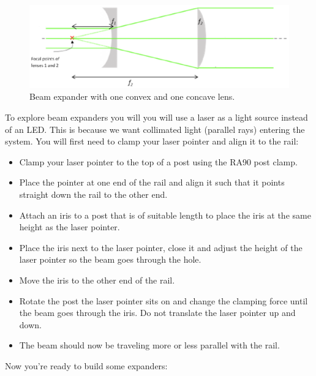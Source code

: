 \documentclass[a4paper]{report}
\begin{document}
\begin{figure}[h]
\center
\includegraphics[width=4.5in]{beamExpander2.eps}
\caption{Beam expander with one convex and one concave lens.}
\label{beamExpander2}
\end{figure}

To explore beam expanders you will you will use a laser as a light source instead of an LED. 
This is because we want collimated light (parallel rays) entering the system. 
You will first need to clamp your laser pointer and align it to the rail:

\begin{itemize}
\item Clamp your laser pointer to the top of a post using the RA90 post clamp. 
\item Place the pointer at one end of the rail and align it such that it points straight down the rail to the other end. 
\item Attach an iris to a post that is of suitable length to place the iris at the same height as the laser pointer. 
\item Place the iris next to the laser pointer, close it and adjust the height of the laser pointer so the beam goes through the hole. 
\item Move the iris to the other end of the rail. 
\item Rotate the post the laser pointer sits on and change the clamping force until the beam goes through the iris. 
Do not translate the laser pointer up and down.
\item The beam should now be traveling more or less parallel with the rail. 
\end{itemize}

Now you're ready to build some expanders:
\end{document}
